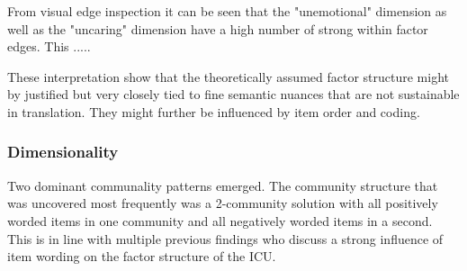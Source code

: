 From visual edge inspection it can be seen that the "unemotional" dimension as well as the "uncaring" dimension have a high number of strong within factor edges.
This .....

These interpretation show that the theoretically assumed factor structure might by justified but very closely tied to fine semantic nuances that are not sustainable in translation. 
They might further be influenced by item order and coding.
  
 
\subsubsection{Dimensionality}
Two dominant communality patterns emerged.
The community structure that was uncovered most frequently was a 2-community solution with all positively worded items in one community and all negatively worded items in a second.
This is in line with multiple previous findings who discuss a strong influence of item wording on the factor structure of the ICU.

